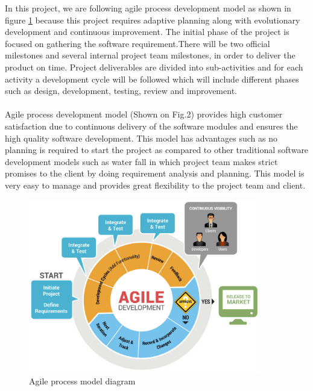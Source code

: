 In this project, we are following agile process development model as shown in figure \ref{fig:process_model} because this project requires adaptive planning along with evolutionary development and continuous improvement. The initial phase of the project is focused on gathering the software requirement.There will be two official milestones and several internal project team milestones, in order to deliver the product on time. Project deliverables are divided into sub-activities and for each activity a development cycle will be followed which will include different phases such as design, development, testing, review and improvement.
\paragraph{} Agile process development model (Shown on Fig.2) provides high customer satisfaction due to continuous delivery of the software modules and ensures the high quality software development. This model has advantages such as no planning is required to start the project as compared to other traditional software development models such as water fall in which project team makes strict promises to the client by doing requirement analysis and planning. This model is very easy to manage and provides great flexibility to the project team and client.

\begin{figure}
\centering
\includegraphics[width=0.9\textwidth]{process_model.png}
\caption{\label{fig:process_model}Agile process model diagram}
\end{figure}

